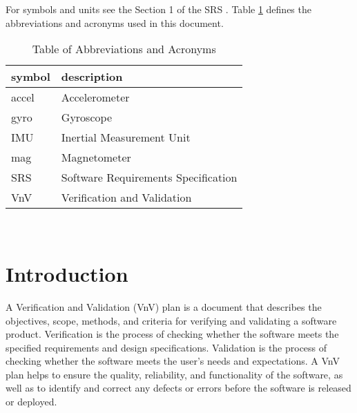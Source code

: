 \documentclass[12pt, titlepage]{article}
\begin{document}
For symbols and units see the Section 1 of the SRS \citep{SRS}. Table \ref{tab:abb} defines the
abbreviations and acronyms used in this document.


\begin{table}[!h]
  \centering
  \caption{Table of Abbreviations and Acronyms}
\renewcommand{\arraystretch}{1.2}
\begin{tabular}{l l}
    \toprule
    \textbf{symbol} & \textbf{description}\\
    \midrule
    accel & Accelerometer \\
    gyro & Gyroscope \\
    IMU & Inertial Measurement Unit\\
    mag & Magnetometer \\
    SRS & Software Requirements Specification\\
    VnV & Verification and Validation \\
    \bottomrule
\end{tabular}\\
\label{tab:abb}
\end{table}



\newpage


\section{Introduction}

A Verification and Validation (VnV) plan is a document that describes the objectives, scope,
methods, and criteria for verifying and validating a software product. Verification is the process
of checking whether the software meets the specified requirements and design specifications.
Validation is the process of checking whether the software meets the user's needs and expectations.
A VnV plan helps to ensure the quality, reliability, and functionality of the software, as well as
to identify and correct any defects or errors before the software is released or deployed.
\end{document}

